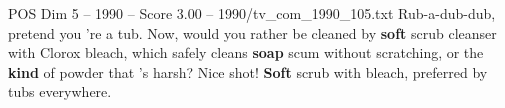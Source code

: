 \begin{textsample}{POS Dim 5 – 1990 – Score 3.00 – 1990/tv\_com\_1990\_105.txt}  \label{ex:f5_pos_023}
Rub-a-dub-dub, pretend you 're a tub.
Now, would you rather be cleaned by \textbf{soft} scrub cleanser with Clorox bleach, which safely cleans \textbf{soap} scum without scratching, or the \textbf{kind} of powder that 's harsh?
Nice shot! \textbf{Soft} scrub with bleach, preferred by tubs everywhere.

\end{textsample}
